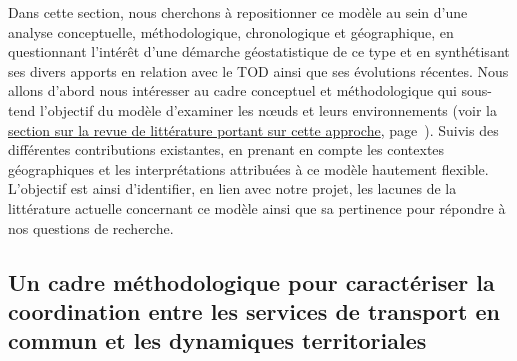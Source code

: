 \begin{refsegment}
Dans cette section, nous cherchons à repositionner ce modèle au sein d'une analyse conceptuelle, méthodologique, chronologique et géographique, en questionnant l'intérêt d'une démarche géostatistique de ce type et en synthétisant ses divers apports en relation avec le \acrshort{TOD} ainsi que ses évolutions récentes. Nous allons d'abord nous intéresser au cadre conceptuel et méthodologique qui sous-tend l'objectif du modèle d'examiner les nœuds et leurs environnements (voir la \hyperref[chap6:litterature-concept]{section sur la revue de littérature portant sur cette approche}, page~\pageref{chap6:litterature-concept}). Suivis des différentes contributions existantes, en prenant en compte les contextes géographiques et les interprétations attribuées à ce modèle hautement flexible. L'objectif est ainsi d'identifier, en lien avec notre projet, les lacunes de la littérature actuelle concernant ce modèle ainsi que sa pertinence pour répondre à nos questions de recherche.%

\subsection{Un cadre méthodologique pour caractériser la coordination entre les services de transport en commun et les dynamiques territoriales
    \label{chap6:litterature-concept}
    }


\end{refsegment}
